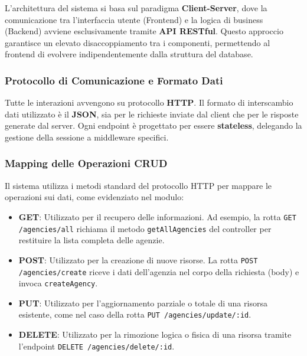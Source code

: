 \documentclass{article}
\begin{document}
L'architettura del sistema si basa sul paradigma \textbf{Client-Server}, dove la comunicazione tra l'interfaccia utente (Frontend) e la logica di business (Backend) avviene esclusivamente tramite \textbf{API RESTful}. Questo approccio garantisce un elevato disaccoppiamento tra i componenti, permettendo al frontend di evolvere indipendentemente dalla struttura del database.

\subsubsection{Protocollo di Comunicazione e Formato Dati}
Tutte le interazioni avvengono su protocollo \textbf{HTTP}. Il formato di interscambio dati utilizzato è il \textbf{JSON}, sia per le richieste inviate dal client che per le risposte generate dal server. Ogni endpoint è progettato per essere \textbf{stateless}, delegando la gestione della sessione a middleware specifici.

\subsubsection{Mapping delle Operazioni CRUD}
Il sistema utilizza i metodi standard del protocollo HTTP per mappare le operazioni sui dati, come evidenziato nel modulo:

\begin{itemize}
    \item \textbf{GET}: Utilizzato per il recupero delle informazioni. Ad esempio, la rotta \texttt{GET /agencies/all} richiama il metodo \texttt{getAllAgencies} del controller per restituire la lista completa delle agenzie.
    \item \textbf{POST}: Utilizzato per la creazione di nuove risorse. La rotta \texttt{POST /agencies/create} riceve i dati dell'agenzia nel corpo della richiesta (body) e invoca \texttt{createAgency}.
    \item \textbf{PUT}: Utilizzato per l'aggiornamento parziale o totale di una risorsa esistente, come nel caso della rotta \texttt{PUT /agencies/update/:id}.
    \item \textbf{DELETE}: Utilizzato per la rimozione logica o fisica di una risorsa tramite l'endpoint \texttt{DELETE /agencies/delete/:id}.
\end{itemize}
\end{document}
